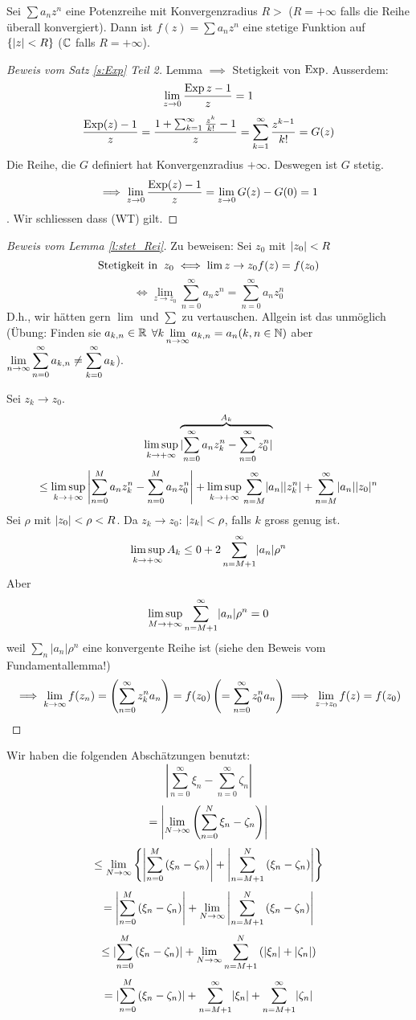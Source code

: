 \begin{Lem}\label{l:stet_Rei}
  Sei $\sum a_nz^n$ eine Potenzreihe mit Konvergenzradius $R>$ ($R=+\infty$ falls die Reihe überall konvergiert). Dann ist $f(z)=\sum a_nz^n$ eine stetige Funktion auf $\left\{ \mathopen| z \mathclose|<R \right\}$ ($\mathbb{C}$ falls $R=+\infty$).
\end{Lem}
\begin{proof}[Beweis vom Satz \ref{s:Exp} Teil 2]
  Lemma $\implies$ Stetigkeit von $\operatorname{Exp}$. Ausserdem:
  \[\displaystyle\lim_{z\rightarrow0}\frac{\operatorname{Exp}{z}-1}{z}=1\]
  \[\frac{\operatorname{Exp}(z)-1}{z}=\frac{1+\sum^\infty_{k=1}\frac{z^k}{k!}-1}{z}=\sum^\infty_{k=1}\frac{z^{k-1}}{k!}=G(z)\]
  Die Reihe, die $G$ definiert hat Konvergenzradius $+\infty$. Deswegen ist $G$ stetig.
  \[\implies\displaystyle\lim_{z\rightarrow0}\frac{\operatorname{Exp}(z)-1}{z}=\displaystyle\lim_{z\rightarrow0}G(z)-G(0)=1\].
Wir schliessen dass (WT) gilt.
\end{proof}
\begin{proof}[Beweis vom Lemma \ref{l:stet_Rei}]
  Zu beweisen: Sei $z_0$ mit $\mathopen| z_0 \mathclose|<R$
  \[\text{Stetigkeit in}\hspace{2mm} z_0\iff \lim{z\to z_0}f(z)=f(z_0)\]
  \[\iff \lim_{z\to z_0}\sum^\infty_{n=0}a_nz^n=\sum^{\infty}_{n=0}a_nz^n_0\]
D.h., wir h\"atten gern $\lim$ und $\sum$ zu vertauschen.
Allgein ist das unm\"oglich (\"Ubung:
  Finden sie $a_{k,n}\in\mathbb{R}$ $\forall k\displaystyle\lim_{n\rightarrow\infty}a_{k,n}=a_n (k,n\in\mathbb{N})$ 
aber $\displaystyle\lim_{n\rightarrow\infty}\sum^\infty_{n=0}a_{k,n}\neq\sum^\infty_{k=0}a_k$). 

Sei $z_k\to z_0$.
  \[\limsup_{k\to+\infty}\overbrace{\mathopen| \sum^\infty_{n=0}a_nz_k^n-\sum^\infty_{n=0}z^n_0 \mathclose|}^{A_k}\]
  \[\leq\limsup_{k\to+\infty}\left|\sum^M_{n=0}a_nz_k^n-\sum^M_{n=0}a_nz^n_0\right|+\limsup_{k\to+\infty}\sum^\infty_{n=M}\mathopen| a_n \mathclose|\mathopen| z^n_k \mathclose|+\sum^\infty_{n=M}\mathopen| a_n \mathclose|\mathopen| z_0 \mathclose|^n\]
  Sei $\rho$ mit $\mathopen| z_0 \mathclose|<\rho<R$. Da $z_k\to z_0$: $\mathopen| z_k \mathclose|<\rho$, falls $k$ gross genug ist.
  \[\limsup_{k\to+\infty}A_k\leq 0+2\sum^\infty_{n=M+1}\mathopen| a_n \mathclose|\rho^n\]
Aber
  \[\limsup_{M\to+\infty}\sum^\infty_{n=M+1}\mathopen| a_n \mathclose|\rho^n =0\]
weil $\sum_n |a_n| \rho^n$ eine konvergente Reihe ist (siehe den Beweis
vom Fundamentallemma!) 
  \[\implies\displaystyle\lim_{k\rightarrow\infty} f(z_n)=\left( \sum^\infty_{n=0}z_k^na_n \right)=f(z_0)\left( =\sum^\infty_{n=0}z_0^na_n \right)\implies \lim_{z\to z_0}f(z)=f(z_0)\]
\end{proof}
\begin{Bem} Wir haben die folgenden Absch\"atzungen benutzt:
  \[\left|\sum^\infty_{n=0}\xi_n-\sum^\infty_{n=0}\zeta_n\right|\]
  \[=\left|\displaystyle\lim_{N\rightarrow\infty}\left( \sum^N_{n=0}\xi_n-\zeta_n \right)\right|\]
  \[\leq \displaystyle\lim_{N\rightarrow\infty}\left\{ \left|\sum^M_{n=0}\left( \xi_n-\zeta_n \right) \right|+
\left|\sum^N_{n=M+1}\left( \xi_n-\zeta_n \right)\right|\right\}\]
  \[=\left|\sum_{n=0}^M\left( \xi_n-\zeta_n \right)\right|+\displaystyle\lim_{N\rightarrow\infty}\left|\sum_{n=M+1}^N\left( \xi_n-\zeta_n \right)\right|\]
  \[\leq\mathopen| \sum_{n=0}^M\left( \xi_n-\zeta_n \right) \mathclose|+\displaystyle\lim_{N\rightarrow\infty}\sum_{n=M+1}^N\left( \mathopen| \xi_n \mathclose|+\mathopen| \zeta_n \mathclose| \right)\]
  \[=\mathopen| \sum_{n=0}^M\left( \xi_n-\zeta_n \right) \mathclose|+\sum_{n=M+1}^\infty\mathopen| \xi_n \mathclose|+\sum_{n=M+1}^\infty\mathopen| \zeta_n \mathclose|\]
\end{Bem}
